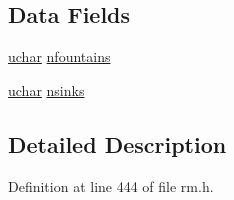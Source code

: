 \subsection*{Data Fields}
\begin{DoxyCompactItemize}
\item 
\hyperlink{config_8h_a65f85814a8290f9797005d3b28e7e5fc}{uchar} \hyperlink{structlevelflags_a7f3dc00cbb7517b44e77ef3156d05521}{nfountains}
\item 
\hyperlink{config_8h_a65f85814a8290f9797005d3b28e7e5fc}{uchar} \hyperlink{structlevelflags_a1d908af257704f05dbaae0b1c69ed24d}{nsinks}
\end{DoxyCompactItemize}


\subsection{Detailed Description}


Definition at line 444 of file rm.\+h.



